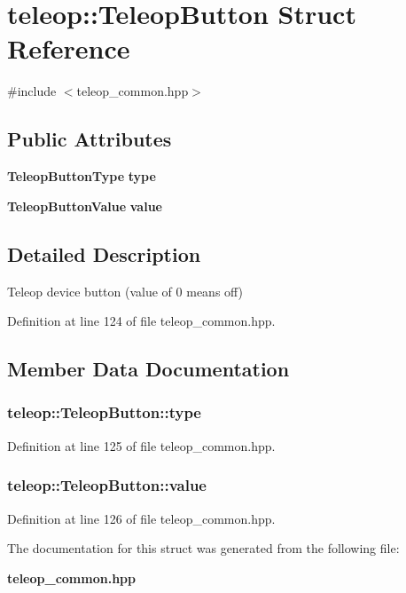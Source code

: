 \section{teleop::TeleopButton Struct Reference}
\label{structteleop_1_1TeleopButton}


{\ttfamily \#include $<$teleop\_\-common.hpp$>$}

\subsection*{Public Attributes}
\begin{DoxyCompactItemize}
\item 
{\bf TeleopButtonType} {\bf type}
\item 
{\bf TeleopButtonValue} {\bf value}
\end{DoxyCompactItemize}


\subsection{Detailed Description}
Teleop device button (value of 0 means off) 

Definition at line 124 of file teleop\_\-common.hpp.



\subsection{Member Data Documentation}
\subsubsection[{type}]{ {\bf teleop::TeleopButton::type}}\label{structteleop_1_1TeleopButton_ade22e95f36234e9a9e417adef318f92d}


Definition at line 125 of file teleop\_\-common.hpp.

\subsubsection[{value}]{ {\bf teleop::TeleopButton::value}}\label{structteleop_1_1TeleopButton_a945881d364a8344b61a6515d765e8531}


Definition at line 126 of file teleop\_\-common.hpp.



The documentation for this struct was generated from the following file:\begin{DoxyCompactItemize}
\item 
{\bf teleop\_\-common.hpp}\end{DoxyCompactItemize}
